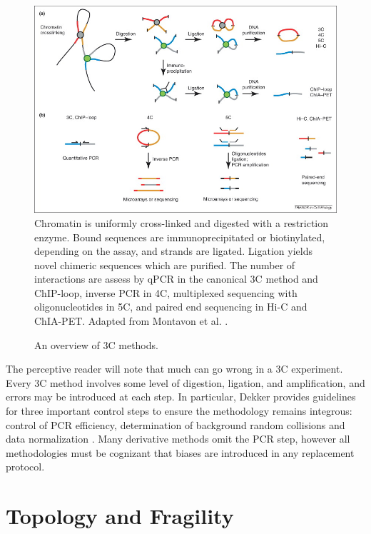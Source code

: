 \begin{figure}[h]
  \centering
  \caption{An overview of \gls{3C} methods.}\label{fig:captureTechniques}
  \includegraphics[width=\textwidth]{figures/biology/CompareChromosomeCapture}
  \medskip
  \small
  Chromatin is uniformly cross-linked and digested with a restriction enzyme.
  Bound sequences are immunoprecipitated or biotinylated, depending on the
  assay, and strands are ligated.  Ligation yields novel chimeric sequences
  which are purified.  The number of interactions are assess by qPCR in
  the canonical \gls{3C} method and ChIP-loop, inverse PCR in 4C, multiplexed
  sequencing with oligonucleotides in 5C, and paired end sequencing in Hi-C
  and ChIA-PET\@.  Adapted from Montavon et al. \citep{montavon2012}.
\end{figure}


The perceptive reader will note that much can go wrong in a \gls{3C} experiment. Every \gls{3C} method involves some level of digestion, ligation,
and amplification, and errors may be introduced at each step.  In particular, Dekker provides guidelines for three important control steps to
ensure the methodology remains integrous: control of PCR efficiency, determination of background random collisions and data
normalization \citep{dekker2006}.  Many derivative methods omit the PCR step, however all methodologies must be cognizant that
biases are introduced in any replacement protocol.

\section*{Topology and Fragility}


